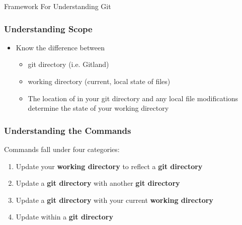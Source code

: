 \begin{frame}[c]
    \begin{center} \Large
        Framework For Understanding Git
    \end{center}
\end{frame}

\begin{frame}[c]\frametitle{Understanding Scope}

	\begin{itemize}
		\item Know the difference between
		\begin{itemize}
			\item git directory (i.e. Gitland)
			\item working directory (current, local state of files)
            \item
			The location of  in your git directory
			and any local file modifications determine the state
			of your working directory
		\end{itemize}
	\end{itemize}
\end{frame}

\begin{frame}[t]\frametitle{Understanding the Commands}
		Commands fall under four categories:
		\begin{enumerate}
			\item Update your \textbf{working directory} to reflect
			a \textbf{git directory} 

			\vspace{0.3cm}
			
			\vspace{0.3cm}
			\item Update a \textbf{git directory} with another \textbf{git
			directory} 

			\vspace{0.3cm}
			
			\vspace{0.3cm}
			\item Update a \textbf{git directory} with your current
			\textbf{working directory} 

			\vspace{0.3cm}

			\vspace{0.3cm}
			\item Update within a \textbf{git directory} 

			\vspace{0.3cm}
		\end{enumerate}
\end{frame}

